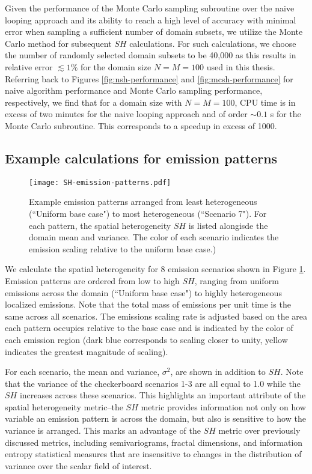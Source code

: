 Given the performance of the Monte Carlo sampling subroutine over the naive looping approach and its ability to reach a high level of accuracy with minimal error when sampling a sufficient number of domain subsets, we utilize the Monte Carlo method for subsequent $SH$ calculations. For such calculations, we choose the number of randomly selected domain subsets to be 40,000 as this results in relative error $\lesssim 1\%$ for the domain size $N=M=100$ used in this thesis. Referring back to Figures \ref{fig:nsh-performance} and \ref{fig:mcsh-performance} for naive algorithm performance and Monte Carlo sampling performance, respectively, we find that for a domain size with $N=M=100$, CPU time is in excess of two minutes for the naive looping approach and of order $\sim0.1$ \si{s} for the Monte Carlo subroutine. This corresponds to a speedup in excess of 1000.

\subsection{Example calculations for emission patterns}

\begin{figure}[h]
	\centering
	\texttt{[image: SH-emission-patterns.pdf]}
	\caption{Example emission patterns arranged from least heterogeneous (``Uniform base case") to most heterogeneous (``Scenario 7").  For each pattern, the spatial heterogeneity $SH$ is listed alongisde the domain mean and variance. The color of each scenario indicates the emission scaling relative to the uniform base case.)}
	\label{fig:emission-patterns}
\end{figure}

We calculate the spatial heterogeneity for 8 emission scenarios shown in Figure \ref{fig:emission-patterns}. Emission patterns are ordered from low to high $SH$, ranging from uniform emissions across the domain (``Uniform base case") to highly heterogeneous localized emissions. Note that the total mass of emissions per unit time is the same across all scenarios. The emissions scaling rate is adjusted based on the area each pattern occupies relative to the base case and is indicated by the color of each emission region (dark blue corresponds to scaling closer to unity, yellow indicates the greatest magnitude of scaling). 

For each scenario, the mean and variance, $\sigma^2$, are shown in addition to $SH$. Note that the variance of the checkerboard scenarios 1-3 are all equal to 1.0 while the $SH$ increases across these scenarios. This highlights an important attribute of the spatial heterogeneity metric--the $SH$ metric provides information not only on how variable an emission pattern is across the domain, but also is sensitive to how the variance is arranged. This marks an advantage of the $SH$ metric over previously discussed metrics, including semivariograms, fractal dimensions, and information entropy statistical measures that are insensitive to changes in the distribution of variance over the scalar field of interest.
